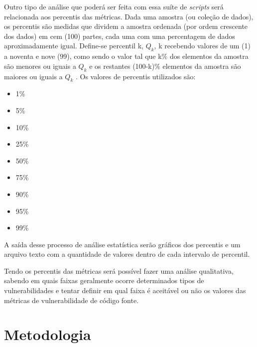 Outro tipo de análise que poderá ser feita com essa suíte de \textit{scripts} será relacionada aos percentis das métricas.
Dada uma amostra (ou coleção de dados), os percentis são medidas que dividem a amostra ordenada (por ordem crescente dos dados) 
em cem (100) partes, cada uma com uma percentagem de dados aproximadamente igual. Define-se percentil k, ${Q_k}$, 
k recebendo valores de um (1) a noventa e nove (99), como sendo o valor tal que k\% dos elementos da amostra são menores ou 
iguais a ${Q_k}$ e os restantes (100-k)\% elementos da amostra são maiores ou iguais a ${Q_k}$ \cite{martins2013}. Os valores
de percentis utilizados são: 

\begin{multicols}{3}
  \begin{itemize}
    \item 1\%
    \item 5\%
    \item 10\%
    \item 25\%
    \item 50\%
    \item 75\%
    \item 90\%
    \item 95\%
    \item 99\%
  \end{itemize}
\end{multicols}

A saída desse processo de análise estatística serão gráficos dos percentis e um arquivo texto com a quantidade de valores 
dentro de cada intervalo de percentil.

Tendo os percentis das métricas será possível fazer uma análise qualitativa, sabendo em quais faixas geralmente ocorre 
determinados tipos de vulnerabilidades e tentar definir em qual faixa é aceitável ou não os valores das métricas de 
vulnerabilidade de código fonte.

\section{Metodologia} \label{metod_estudo}

